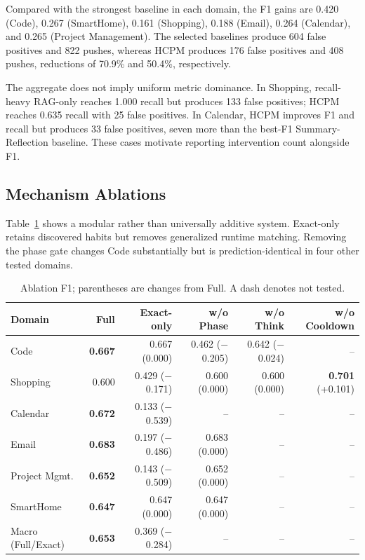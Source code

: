 \documentclass[sigconf,anonymous,review]{acmart}
\newcommand{\system}{HCPM}
\begin{document}
Compared with the strongest baseline in each domain, the F1 gains are 0.420 (Code), 0.267 (SmartHome), 0.161 (Shopping), 0.188 (Email), 0.264 (Calendar), and 0.265 (Project Management).
The selected baselines produce 604 false positives and 822 pushes, whereas \system{} produces 176 false positives and 408 pushes, reductions of 70.9\% and 50.4\%, respectively.

The aggregate does not imply uniform metric dominance.
In Shopping, recall-heavy RAG-only reaches 1.000 recall but produces 133 false positives; \system{} reaches 0.635 recall with 25 false positives.
In Calendar, \system{} improves F1 and recall but produces 33 false positives, seven more than the best-F1 Summary-Reflection baseline.
These cases motivate reporting intervention count alongside F1.

\subsection{Mechanism Ablations}
\label{sec:ablation}

Table~\ref{tab:ablation} shows a modular rather than universally additive system.
Exact-only retains discovered habits but removes generalized runtime matching.
Removing the phase gate changes Code substantially but is prediction-identical in four other tested domains.

\begin{table}[t]
\centering
\caption{Ablation F1; parentheses are changes from Full. A dash denotes not tested.}
\label{tab:ablation}
\small
\begin{tabular}{lrrrrr}
\toprule
Domain & Full & Exact-only & w/o Phase & w/o Think & w/o Cooldown \\
\midrule
Code & \textbf{0.667} & 0.667 (0.000) & 0.462 ($-$0.205) & 0.642 ($-$0.024) & -- \\
Shopping & 0.600 & 0.429 ($-$0.171) & 0.600 (0.000) & 0.600 (0.000) & \textbf{0.701} (+0.101) \\
Calendar & \textbf{0.672} & 0.133 ($-$0.539) & -- & -- & -- \\
Email & \textbf{0.683} & 0.197 ($-$0.486) & 0.683 (0.000) & -- & -- \\
Project Mgmt. & \textbf{0.652} & 0.143 ($-$0.509) & 0.652 (0.000) & -- & -- \\
SmartHome & \textbf{0.647} & 0.647 (0.000) & 0.647 (0.000) & -- & -- \\
\midrule
Macro (Full/Exact) & \textbf{0.653} & 0.369 ($-$0.284) & -- & -- & -- \\
\bottomrule
\end{tabular}
\end{table}
\end{document}
